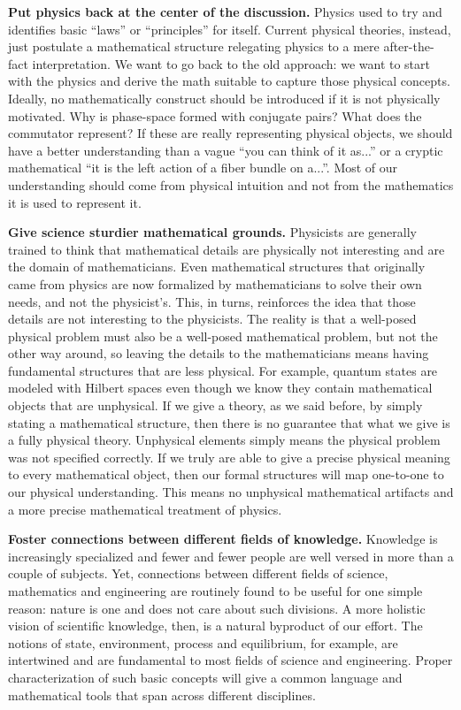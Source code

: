 \documentclass[twocolumn]{article}
\begin{document}
\textbf{Put physics back at the center of the discussion.} Physics used to try and identifies basic ``laws'' or ``principles'' for itself. Current physical theories, instead, just postulate a mathematical structure relegating physics to a mere after-the-fact interpretation. We want to go back to the old approach: we want to start with the physics and derive the math suitable to capture those physical concepts. Ideally, no mathematically construct should be introduced if it is not physically motivated. Why is phase-space formed with conjugate pairs? What does the commutator represent? If these are really representing physical objects, we should have a better understanding than a vague ``you can think of it as...'' or a cryptic mathematical ``it is the left action of a fiber bundle on a...''. Most of our understanding should come from physical intuition and not from the mathematics it is used to represent it.

\textbf{Give science sturdier mathematical grounds.} Physicists are generally trained to think that mathematical details are physically not interesting and are the domain of mathematicians. Even mathematical structures that originally came from physics are now formalized by mathematicians to solve their own needs, and not the physicist's. This, in turns, reinforces the idea that those details are not interesting to the physicists. The reality is that a well-posed physical problem must also be a well-posed mathematical problem, but not the other way around, so leaving the details to the mathematicians means having fundamental structures that are less physical. For example, quantum states are modeled with Hilbert spaces even though we know they contain mathematical objects that are unphysical. If we give a theory, as we said before, by simply stating a mathematical structure, then there is no guarantee that what we give is a fully physical theory. Unphysical elements simply means the physical problem was not specified correctly. If we truly are able to give a precise physical meaning to every mathematical object, then our formal structures will map one-to-one to our physical understanding. This means no unphysical mathematical artifacts and a more precise mathematical treatment of physics.

\textbf{Foster connections between different fields of knowledge.} Knowledge is increasingly specialized and fewer and fewer people are well versed in more than a couple of subjects. Yet, connections between different fields of science, mathematics and engineering are routinely found to be useful for one simple reason: nature is one and does not care about such divisions. A more holistic vision of scientific knowledge, then, is a natural byproduct of our effort. The notions of state, environment, process and equilibrium, for example, are intertwined and are fundamental to most fields of science and engineering. Proper characterization of such basic concepts will give a common language and mathematical tools that span across different disciplines.
\end{document}
